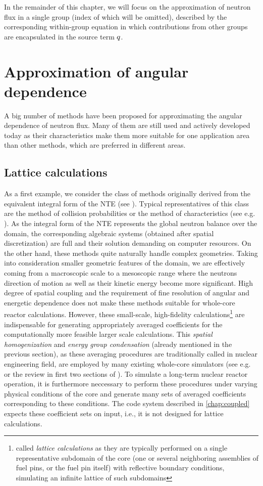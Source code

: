 In the remainder
of this chapter, we will focus on the approximation of neutron flux in a single
group (index of which will be omitted), described by the corresponding within-group equation in which contributions from
other groups are encapsulated in the source term $q$.

\section{Approximation of angular dependence}

A big number of methods have been proposed for approximating the angular dependence of neutron
flux. Many of them are still used and actively developed today as their characteristics make them more suitable for one
application area than other methods, which are preferred in different areas.

\subsection{Lattice calculations} \label{sec:lattice}
As a first example, we consider the class of
methods originally derived from the equivalent integral form of the NTE (see ). Typical
representatives of this class are the method of collision probabilities or the method of characteristics (see e.g.
\cite{Cho2,Wu1,Hursin1,Petkov1,Sanchez1}). As the integral form of the NTE represents the global neutron balance over
the domain, the corresponding algebraic systems (obtained after spatial discretization) are full and
their solution demanding on computer resources. On the other hand, these methods quite naturally handle complex
geometries. Taking into consideration smaller geometric features of the domain, we are effectively coming from a
macroscopic scale to a mesoscopic range where the neutrons direction of motion as well as their kinetic energy become
more significant. High degree of spatial coupling and the requirement of fine resolution of angular and energetic
dependence does not make these methods suitable for whole-core reactor calculations.
However, these small-scale,
high-fidelity calculations\footnote{called \textit{lattice calculations} as they are typically performed on a single
representative subdomain of the core (one or several neighboring assemblies of fuel pins, or the fuel pin itself)
with reflective boundary conditions, simulating an infinite lattice of such subdomains} are indispensable for
generating appropriately averaged coefficients for the computationally more feasible larger scale calculations.
This \textit{spatial homogenization} and \textit{energy group condensation} (already mentioned in the previous
section), as these averaging procedures are traditionally called in nuclear engineering field, are employed by many existing whole-core simulators (see e.g.
\cite[Chap. 17]{Reuss1} or the review in first two sections of \cite{Sanchez7}). To simulate a long-term nuclear reactor
operation, it is furthermore neccessary to perform these procedures under varying physical conditions of the core and
generate many sets of averaged coefficients corresponding to these conditions. The code system described in
\cref{chap:coupled} expects these coefficient sets on input, i.e., it is not designed for lattice calculations.

